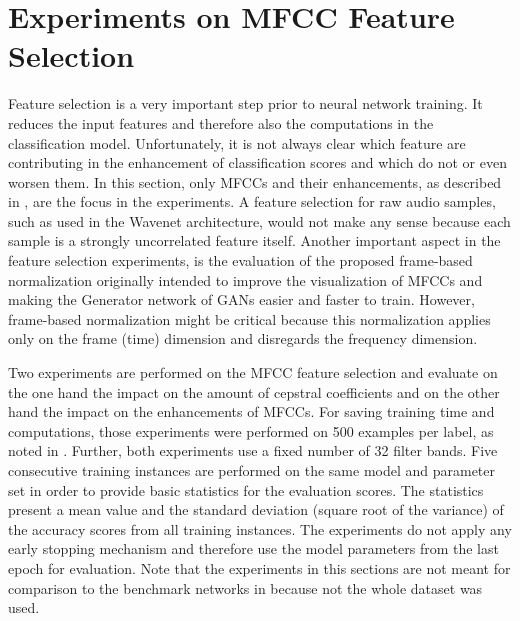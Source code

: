 
\section{Experiments on MFCC Feature Selection}\label{sec:exp_fs}
Feature selection is a very important step prior to neural network training.
It reduces the input features and therefore also the computations in the classification model.
Unfortunately, it is not always clear which feature are contributing in the enhancement of classification scores and which do not or even worsen them.
In this section, only MFCCs and their enhancements, as described in , are the focus in the experiments.
A feature selection for raw audio samples, such as used in the Wavenet architecture, would not make any sense because each sample is a strongly uncorrelated feature itself.
Another important aspect in the feature selection experiments, is the evaluation of the proposed frame-based normalization  originally intended to improve the visualization of MFCCs and making the Generator network of GANs easier and faster to train.
However, frame-based normalization might be critical because this normalization applies only on the frame (time) dimension and disregards the frequency dimension.

Two experiments are performed on the MFCC feature selection and evaluate on the one hand the impact on the amount of cepstral coefficients and on the other hand the impact on the enhancements of MFCCs.
For saving training time and computations, those experiments were performed on 500 examples per label, as noted in .
Further, both experiments use a fixed number of 32 filter bands.
Five consecutive training instances are performed on the same model and parameter set in order to provide basic statistics for the evaluation scores.
The statistics present a mean value and the standard deviation (square root of the variance) of the accuracy scores from all training instances.
The experiments do not apply any early stopping mechanism and therefore use the model parameters from the last epoch for evaluation.
Note that the experiments in this sections are not meant for comparison to the benchmark networks in  because not the whole dataset was used.



